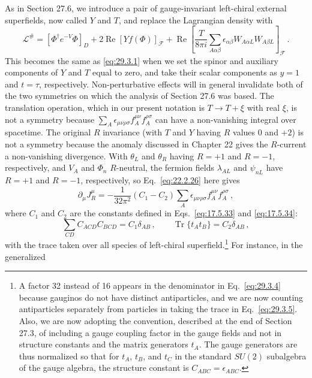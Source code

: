 As in Section 27.6, we introduce a pair of gauge-invariant left-chiral
external superfields, now called \(Y\) and \(T\), and replace the
Lagrangian density with
\begin{equation}
  \mathcal{L}^{\#}
  =
  \left[\Phi^\dagger e^{-V}\Phi\right]_D
  +2\operatorname{Re}\left[Yf(\Phi)\right]_{\mathcal{F}}
  +\operatorname{Re}
  \left[
    \frac{T}{8\pi i}
    \sum_{A\alpha\beta}
    \epsilon_{\alpha\beta}W_{A\alpha L}W_{A\beta L}
  \right]_{\mathcal{F}}\,.
  \tag{29.3.3}\label{eq:29.3.3}
\end{equation}
This becomes the same as \eqref{eq:29.3.1} when we set the spinor and
auxiliary components of \(Y\) and \(T\) equal to zero, and take their
scalar components as \(y=1\) and \(t=\tau\), respectively.
Non-perturbative effects will in general invalidate both of the two
symmetries on which the analysis of Section 27.6 was based. The translation
operation, which in our present notation is \(T\longrightarrow T+\xi\)
with real \(\xi\), is not a symmetry because
\(\sum_A\epsilon_{\mu\nu\rho\sigma}f_A^{\mu\nu}f_A^{\rho\sigma}\) can
have a non-vanishing integral over spacetime. The original \(R\) invariance
(with \(T\) and \(Y\) having \(R\) values 0 and \(+2\)) is not a symmetry
because the anomaly discussed in Chapter 22 gives the \(R\)-current a
non-vanishing divergence. With \(\theta_L\) and \(\theta_R\) having
\(R=+1\) and \(R=-1\), respectively, and \(V_A\) and \(\Phi_n\)
\(R\)-neutral, the fermion fields \(\lambda_{AL}\) and \(\psi_{nL}\)
have \(R=+1\) and \(R=-1\), respectively, so Eq.~\eqref{eq:22.2.26}
here gives
\begin{equation}
  \partial_\mu J_R^\mu
  =
  -\frac{1}{32\pi^2}(C_1-C_2)
  \sum_A\epsilon_{\mu\nu\rho\sigma}
  f_A^{\mu\nu}f_A^{\rho\sigma}\,,
  \tag{29.3.4}\label{eq:29.3.4}
\end{equation}
where \(C_1\) and \(C_2\) are the constants defined in
Eqs.~\eqref{eq:17.5.33} and \eqref{eq:17.5.34}:
\begin{equation}
  \sum_{CD}C_{ACD}C_{BCD}=C_1\delta_{AB}\,,
  \qquad
  \operatorname{Tr}\{t_A t_B\}=C_2\delta_{AB}\,,
  \tag{29.3.5}\label{eq:29.3.5}
\end{equation}
with the trace taken over all species of left-chiral
superfield.\footnote{A factor 32 instead of 16 appears in the denominator
in Eq.~\eqref{eq:29.3.4} because gauginos do not have distinct
antiparticles, and we are now counting antiparticles separately from
particles in taking the trace in Eq.~\eqref{eq:29.3.5}. Also, we are now
adopting the convention, described at the end of Section 27.3, of including
a gauge coupling factor in the gauge fields and not in structure constants
and the matrix generators \(t_A\). The gauge generators are thus normalized
so that for \(t_A\), \(t_B\), and \(t_C\) in the standard \(SU(2)\)
subalgebra of the gauge algebra, the structure constant is
\(C_{ABC}=\epsilon_{ABC}\).} For instance, in the generalized
